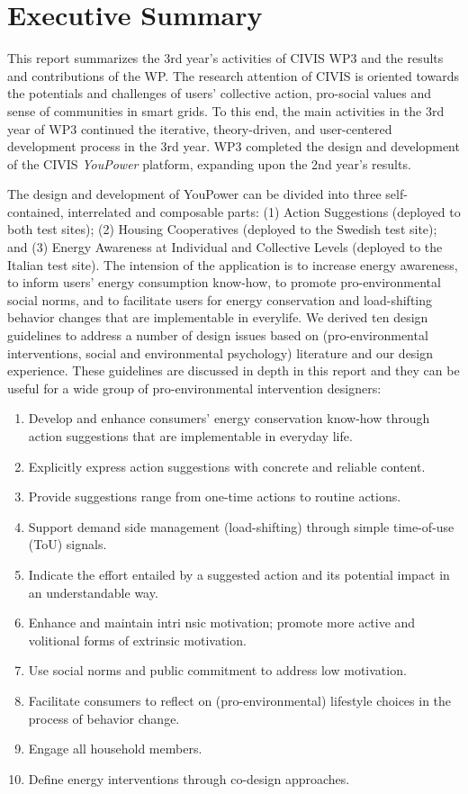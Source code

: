 \section*{Executive Summary}

This report summarizes the 3rd year's activities of CIVIS WP3 and the results and contributions of the WP. The research attention of CIVIS is oriented towards the potentials and challenges of users' collective action, pro-social values and sense of communities in smart grids. To this end, the main activities in the 3rd year of WP3 continued the iterative, theory-driven, and user-centered development process in the 3rd year. WP3 completed the design and development of the CIVIS \textit{YouPower} platform, expanding upon the 2nd year's results.

The design and development of YouPower can be divided into three self-contained, interrelated and composable parts: (1) Action Suggestions (deployed to both test sites); (2) Housing Cooperatives (deployed to the Swedish test site); and (3) Energy Awareness at Individual and Collective Levels (deployed to the Italian test site). The intension of the application is to increase energy awareness, to inform users' energy consumption know-how, to promote pro-environmental social norms, and to facilitate users for energy conservation and load-shifting behavior changes that are implementable in everylife. We derived ten design guidelines to address a number of design issues based on (pro-environmental interventions, social and environmental psychology) literature and our design experience. These guidelines are discussed in depth in this report and they can be useful for a wide group of pro-environmental intervention designers: 
\begin{enumerate}
\item Develop and enhance consumers' energy conservation know-how through action suggestions
that are implementable in everyday life.
\item Explicitly express action suggestions with concrete and reliable content.
\item Provide suggestions range from one-time actions to routine actions.
\item Support demand side management (load-shifting) through simple time-of-use (ToU) signals.
\item Indicate the effort entailed by a suggested action and its potential impact in an understandable way.
\item Enhance and maintain intri nsic motivation; promote more active and volitional forms
of extrinsic motivation.
\item Use social norms and public commitment to address low motivation.
\item Facilitate consumers to reflect on (pro-environmental) lifestyle choices in the process
of behavior change.
\item Engage all household members.
\item Define energy interventions through co-design approaches.
\end{enumerate}

